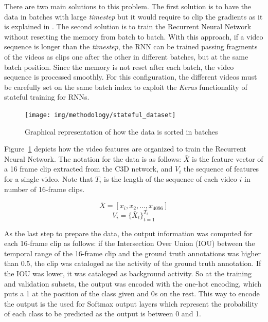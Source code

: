 There are two main solutions to this problem. The first solution is to have the data in batches with large \textit{timestep} but it would require to clip the gradients as it is explained in \cite{pascanu2012difficulty}. The second solution is to train the Recurrent Neural Network without resetting the memory from batch to batch. With this approach, if a video sequence is longer than the \textit{timestep}, the RNN can be trained passing fragments of the videos as clips one after the other in different batches, but at the same batch position. Since the memory is not reset after each batch, the video sequence is processed smoothly. For this configuration, the different videos must be carefully set on the same batch index to exploit the \textit{Keras} functionality of stateful training for RNNs.

\begin{figure}[ht]
\begin{center}
\texttt{[image: img/methodology/stateful\_dataset]}
\end{center}
\caption{Graphical representation of how the data is sorted in batches}
\label{fig:stateful_dataset}
\end{figure}

Figure~\ref{fig:stateful_dataset} depicts how the video features are organized to train the Recurrent Neural Network. The notation for the data is as follows: $\bar{X}$ is the feature vector of a 16 frame clip extracted from the C3D network, and $V_i$ the sequence of features for a single video. Note that $T_i$ is the length of the sequence of each video $i$ in number of 16-frame clips.

\begin{equation}
	\bar{X} = [x_i, x_2, \ldots, x_{4096}]
\end{equation}
\begin{equation}
	V_i = \{ \bar{X}_t \}_{t=1}^{T_i}
\end{equation}


As the last step to prepare the data, the output information was computed for each 16-frame clip as follows: if the Intersection Over Union (IOU) between the temporal range of the 16-frame clip and the ground truth annotations was higher than $0.5$, the clip was cataloged as the activity of the ground truth annotation. If the IOU was lower, it was cataloged as background activity. So at the training and validation subsets, the output was encoded with the one-hot encoding, which puts a 1 at the position of the class given and 0s on the rest. This way to encode the output is the used for Softmax output layers which represent the probability of each class to be predicted as the output is between 0 and 1.

